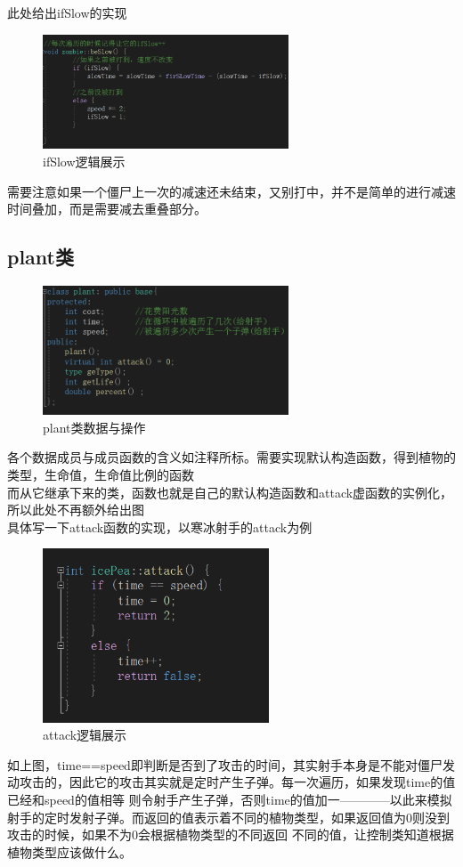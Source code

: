 \documentclass[12pt,a4paper,UTF8]{article}
\begin{document}
      此处给出ifSlow的实现
      \begin{figure}[H]
        \centering
      \includegraphics[width=0.65\textwidth]{figure/ifSlow.png}
      \caption{ifSlow逻辑展示}
      \end{figure}
      需要注意如果一个僵尸上一次的减速还未结束，又别打中，并不是简单的进行减速时间叠加，而是需要减去重叠部分。

    \subsection{plant类}
      \begin{figure}[H]
        \centering
      \includegraphics[width=0.65\textwidth]{figure/plant.png}
      \caption{plant类数据与操作}
      \end{figure}
      各个数据成员与成员函数的含义如注释所标。需要实现默认构造函数，得到植物的类型，生命值，生命值比例的函数\\
      而从它继承下来的类，函数也就是自己的默认构造函数和attack虚函数的实例化，所以此处不再额外给出图\\
      具体写一下attack函数的实现，以寒冰射手的attack为例
      \begin{figure}[H]
        \centering
      \includegraphics[width=0.6\textwidth]{figure/attack.png}
      \caption{attack逻辑展示}
      \end{figure}
      如上图，time==speed即判断是否到了攻击的时间，其实射手本身是不能对僵尸发动攻击的，因此它的攻击其实就是定时产生子弹。每一次遍历，如果发现time的值已经和speed的值相等
      则令射手产生子弹，否则time的值加一————以此来模拟射手的定时发射子弹。而返回的值表示着不同的植物类型，如果返回值为0则没到攻击的时候，如果不为0会根据植物类型的不同返回
      不同的值，让控制类知道根据植物类型应该做什么。
\end{document}
